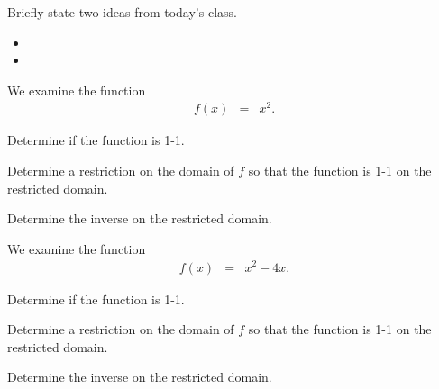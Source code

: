 \begin{problem}
\item Briefly state two ideas from today's class.
  \begin{itemize}
  \item 
  \item 
  \end{itemize}
\item  We examine the function
	\begin{eqnarray*}
		f(x) & = & x^2.
	\end{eqnarray*}
  \begin{subproblem}
    \item Determine if the function is 1-1.
    \item Determine a restriction on the domain of $f$ so that the function 
	    is 1-1 on the restricted domain.
    \item Determine the inverse on the restricted domain.
  \end{subproblem}
\item  We examine the function
	\begin{eqnarray*}
		f(x) & = & x^2-4x.
	\end{eqnarray*}
  \begin{subproblem}
    \item Determine if the function is 1-1.
    \item Determine a restriction on the domain of $f$ so that the function 
	    is 1-1 on the restricted domain.
    \item Determine the inverse on the restricted domain.
  \end{subproblem}
\end{problem}



